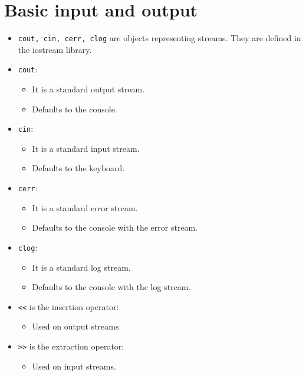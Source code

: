 \section{Basic input and output  }
\begin{itemize}
    \item \texttt{cout, cin, cerr, clog} are objects representing streams. They are defined in the iostream library. 
    \item \texttt{cout}:
        \begin{itemize}
            \item It is a standard output stream.
            \item Defaults to the console.
        \end{itemize}
    \item \texttt{cin}:
        \begin{itemize}
            \item It is a standard input stream. 
            \item Defaults to the keyboard.
        \end{itemize}
    \item \texttt{cerr}: 
        \begin{itemize}
            \item It is a standard error stream.
            \item Defaults to the console with the error stream.
        \end{itemize}
    \item \texttt{clog}:
        \begin{itemize}
            \item It is a standard log stream.
            \item Defaults to the console with the log stream.
        \end{itemize}
    
    \item \texttt{<<} is the insertion operator: 
        \begin{itemize}
            \item Used on output streams.
        \end{itemize}
    
    \item \texttt{>>} is the extraction operator: 
        \begin{itemize}
            \item Used on input streams.
        \end{itemize}
\end{itemize}

